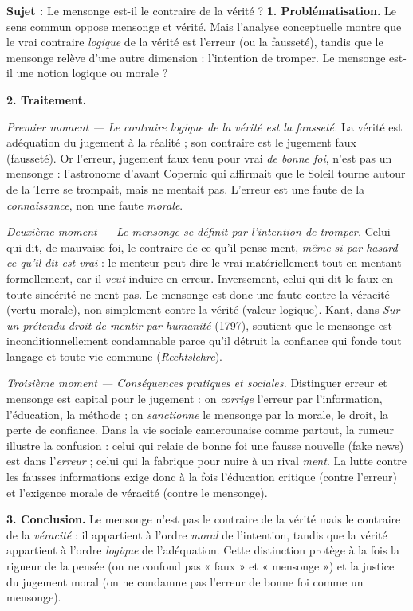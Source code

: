\documentclass[11pt]{article}
\newcommand{\cle}[1]{{\popxbold\color{popdark}#1}}
\begin{document}
\begin{exoresolu}
\textbf{Sujet :} Le mensonge est-il le contraire de la vérité ?
\tcblower
\textbf{1. Problématisation.} Le sens commun oppose mensonge et vérité. Mais l'analyse conceptuelle montre que le vrai contraire \emph{logique} de la vérité est l'erreur (ou la fausseté), tandis que le mensonge relève d'une autre dimension : l'intention de tromper. Le mensonge est-il une notion logique ou morale ?

\textbf{2. Traitement.}

\emph{Premier moment — Le contraire logique de la vérité est la fausseté.} La vérité est adéquation du jugement à la réalité ; son contraire est le jugement faux (fausseté). Or l'erreur, jugement faux tenu pour vrai \emph{de bonne foi}, n'est pas un mensonge : l'astronome d'avant Copernic qui affirmait que le Soleil tourne autour de la Terre se trompait, mais ne mentait pas. L'erreur est une faute de la \emph{connaissance}, non une faute \emph{morale}.

\emph{Deuxième moment — Le mensonge se définit par l'intention de tromper.} Celui qui dit, de mauvaise foi, le contraire de ce qu'il pense ment, \emph{même si par hasard ce qu'il dit est vrai} : le menteur peut dire le vrai matériellement tout en mentant formellement, car il \emph{veut} induire en erreur. Inversement, celui qui dit le faux en toute sincérité ne ment pas. Le mensonge est donc une faute contre la \cle{véracité} (vertu morale), non simplement contre la vérité (valeur logique). Kant, dans \emph{Sur un prétendu droit de mentir par humanité} (1797), soutient que le mensonge est inconditionnellement condamnable parce qu'il détruit la confiance qui fonde tout langage et toute vie commune (\emph{Rechtslehre}).

\emph{Troisième moment — Conséquences pratiques et sociales.} Distinguer erreur et mensonge est capital pour le jugement : on \emph{corrige} l'erreur par l'information, l'éducation, la méthode ; on \emph{sanctionne} le mensonge par la morale, le droit, la perte de confiance. Dans la vie sociale camerounaise comme partout, la rumeur illustre la confusion : celui qui relaie de bonne foi une fausse nouvelle (fake news) est dans l'\emph{erreur} ; celui qui la fabrique pour nuire à un rival \emph{ment}. La lutte contre les fausses informations exige donc à la fois l'éducation critique (contre l'erreur) et l'exigence morale de véracité (contre le mensonge).

\textbf{3. Conclusion.} Le mensonge n'est pas le contraire de la vérité mais le contraire de la \emph{véracité} : il appartient à l'ordre \emph{moral} de l'intention, tandis que la vérité appartient à l'ordre \emph{logique} de l'adéquation. Cette distinction protège à la fois la rigueur de la pensée (on ne confond pas « faux » et « mensonge ») et la justice du jugement moral (on ne condamne pas l'erreur de bonne foi comme un mensonge).
\end{exoresolu}
\end{document}
